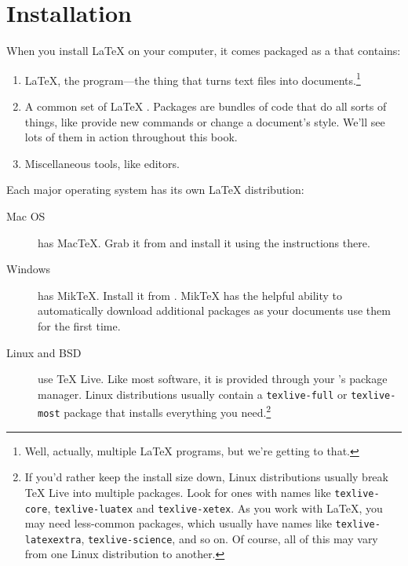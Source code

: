 \chapter{Installation}
\label{installation}

When you install \LaTeX{} on your computer, it comes packaged as a
 that contains:
\begin{enumerate}
\item \LaTeX, the program---the thing that turns text files into
    documents.\footnote{Well, actually, multiple \LaTeX{} programs,
    but we're getting to that.}
\item A common set of \LaTeX{} .
    Packages are bundles of code that do all sorts of things,
    like provide new commands or change a document's style.
    We'll see lots of them in action throughout this book.
\item Miscellaneous tools, like editors.
\end{enumerate}
Each major operating system has its own \LaTeX{} distribution:
\begin{description}
\item[Mac OS] has Mac\TeX. Grab it from 
    and install it using the instructions there.

\item[Windows] has Mik\TeX.
    Install it from .
    Mik\TeX{} has the helpful ability to automatically download
    additional packages as your documents use them for the first time.

\item[Linux and BSD] use \TeX{} Live.
    Like most software, it is provided through your
    's package manager.
    Linux distributions usually contain a \texttt{texlive-\allowbreak full}
    or \texttt{texlive-\allowbreak most} package that installs everything
    you need.\punckern\footnote{%
    If you'd rather keep the install size down,
    Linux distributions usually break \TeX{} Live into multiple packages.
    Look for ones with names like
    \texttt{texlive-\allowbreak core}, \texttt{texlive-\allowbreak luatex}
    and \texttt{texlive-\allowbreak xetex}.
    As you work with \LaTeX, you may need less-common packages,
    which usually have names like \texttt{texlive-\allowbreak latexextra},
    \texttt{texlive-\allowbreak science}, and so on.
    Of course, all of this may vary from one Linux distribution to another.}
\end{description}

